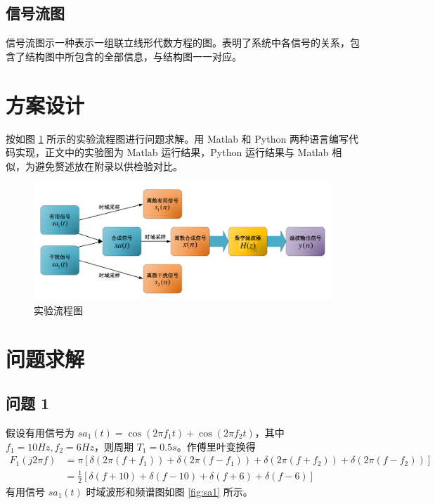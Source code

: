 \documentclass[12pt,AutoFakeBold]{article}
\begin{document}
\subsection{信号流图}

信号流图示一种表示一组联立线形代数方程的图。表明了系统中各信号的关系，包含了结构图中所包含的全部信息，与结构图一一对应。

\section{方案设计}

按如图 \ref{fig:workflow} 所示的实验流程图进行问题求解。用 Matlab 和 Python 两种语言编写代码实现，正文中的实验图为 Matlab 运行结果，Python 运行结果与 Matlab 相似，为避免赘述放在附录以供检验对比。

\begin{figure}[htbp]
	\centering
	\includegraphics[width=\textwidth]{figure/workflow.pdf}
	\caption{实验流程图} \label{fig:workflow}
\end{figure}

\section{问题求解}

\subsection{问题 1}

假设有用信号为 $sa_1(t)=\cos(2\pi f_1t)+\cos(2\pi f_2t)$，其中 $f_1=10Hz, f_2=6Hz$，则周期 $T_1=0.5s$。作傅里叶变换得 
%
\begin{align}
F_1(j2\pi f) &= \pi\left[\delta(2\pi(f+f_1))+\delta(2\pi(f-f_1))+\delta(2\pi(f+f_2))+\delta(2\pi(f-f_2))\right] \\
 &= \frac{1}{2}\left[\delta(f+10)+\delta(f-10)+\delta(f+6)+\delta(f-6)\right] 
\end{align}
%
有用信号 $sa_1(t)$ 时域波形和频谱图如图 \ref{fig:sa1} 所示。
\end{document}
